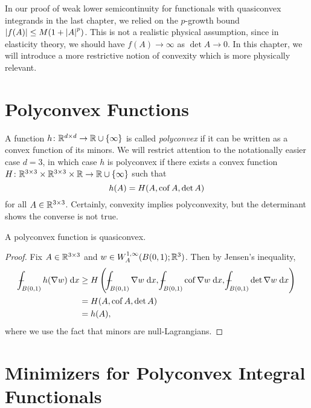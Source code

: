 In our proof of weak lower semicontinuity for functionals with quasiconvex integrands in the last chapter, we relied on the $p$-growth bound $\left\lvert {f(A)} \right\rvert \leq M(1 + \left\lvert {A} \right\rvert^p)$. This is not a realistic physical assumption, since in elasticity theory, we should have $f(A) \to \infty$ as $\det{A} \to 0$. In this chapter, we will introduce a more restrictive notion of convexity which is more physically relevant.


\section{Polyconvex Functions}

A function $h \colon \mathbb{R}^{d \times d} \to \mathbb{R} \cup \left\{ {\infty} \right\}$ is called \textit{polyconvex} if it can be written as a convex function of its minors. We will restrict attention to the notationally easier case $d = 3$, in which case $h$ is polyconvex if there exists a convex function $H \colon \mathbb{R}^{3 \times 3} \times \mathbb{R}^{3 \times 3} \times \mathbb{R} \to \mathbb{R} \cup \left\{ {\infty} \right\}$ such that 
\begin{equation}
    h(A) = H(A,\operatorname{\mathrm{cof}}{A},\det{A})
\end{equation}
for all $A \in \mathbb{R}^{3 \times 3}$. Certainly, convexity implies polyconvexity, but the determinant shows the converse is not true.
\begin{proposition}
    A polyconvex function is quasiconvex.
\end{proposition}
\begin{proof}
    Fix $A \in \mathbb{R}^{3 \times 3}$ and $w \in W_A^{1,\infty}(B(0,1);\mathbb{R}^3)$. Then by Jensen's inequality,
    \begin{equation} \begin{aligned}
        \dashint_{B(0,1)} h(\nabla w) \; \d x 
        &\geq H\parens{ \dashint_{B(0,1)} \nabla w \; \d x, \dashint_{B(0,1)} \cof{\nabla w} \; \d x, \dashint_{B(0,1)} \det{\nabla w} \; \d x } \\
        &= H(A,\cof{A},\det{A}) \\
        &= h(A),
    \end{aligned} \end{equation}
    where we use the fact that minors are null-Lagrangians.
\end{proof}


\section{Minimizers for Polyconvex Integral Functionals}

